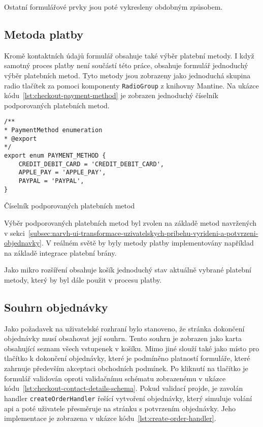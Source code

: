 Ostatní formulářové prvky jsou poté vykresleny obdobným způsobem.

\subsection{Metoda platby}
\label{subsec:implementace-checkout-payment-method}
Kromě kontaktních údajů formulář obsahuje také výběr platební metody.
I když samotný proces platby není součástí této práce, obsahuje formulář jednoduchý výběr platebních metod.
Tyto metody jsou zobrazeny jako jednoduchá skupina radio tlačítek za pomoci komponenty \texttt{RadioGroup} z knihovny Mantine.
Na ukázce kódu~\ref{lst:checkout-payment-method} je zobrazen jednoduchý číselník podporovaných platebních metod.

\begin{listing}[h]
\begin{verbatim}
/**
* PaymentMethod enumeration
* @export
*/
export enum PAYMENT_METHOD {
	CREDIT_DEBIT_CARD = 'CREDIT_DEBIT_CARD',
	APPLE_PAY = 'APPLE_PAY',
	PAYPAL = 'PAYPAL',
}
\end{verbatim}
\caption{Číselník podporovaných platebních metod}
\label{lst:checkout-payment-method}
\end{listing}

Výběr podporovaných platebních metod byl zvolen na základě metod navržených v sekci~\ref{subsec:narvh-ui-transformace-uzivatelskych-pribehu-vyrideni-a-potvrzeni-objednavky}.
V reálném světě by byly metody platby implementovány například na základě integrace platební brány.

Jako mikro rozšíření obsahuje košík jednoduchý stav aktuálně vybrané platební metody, který by byl dále použit v procesu platby.

\subsection{Souhrn objednávky}
\label{subsec:implementace-checkout-souhrn}
Jako požadavek na uživatelské rozhraní bylo stanoveno, že stránka dokončení objednávky musí obsahovat její souhrn.
Tento souhrn je zobrazen jako karta obsahující seznam všech vstupenek v košíku.
Mimo jiné slouží také jako místo pro tlačítko k dokončení objednávky, které je podmíněno platností formuláře, které zahrnuje především akceptaci obchodních podmínek.
Po kliknutí na tlačítko je formulář validován oproti validačnímu schématu zobrazenému v ukázce kódu~\ref{lst:checkout-contact-details-schema}.
Pokud validací projde, je zavolán handler \texttt{createOrderHandler} řešící vytvoření objednávky, který simuluje volání \ac{api} a poté uživatele přesměruje na stránku s potvrzením objednávky.
Jeho implementace je zobrazena v ukázce kódu~\ref{lst:create-order-handler}.

